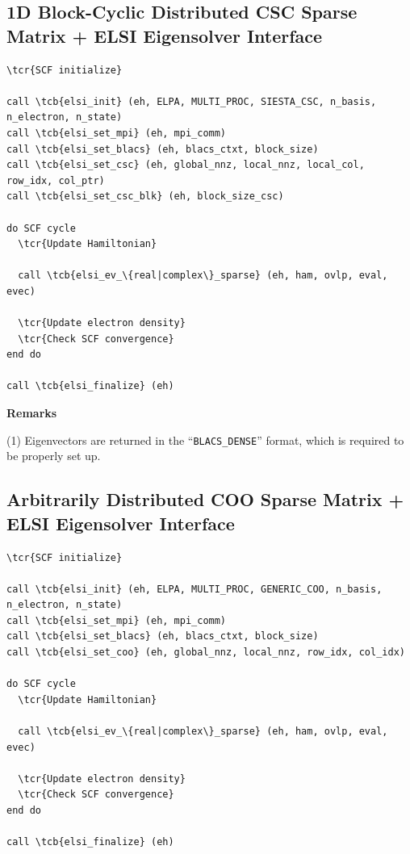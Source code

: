 \documentclass{report}
\newcommand{\tcb}[1]{\textcolor{blue}{#1}}
\newcommand{\tcr}[1]{\textcolor{red}{#1}}
\begin{document}
\subsection*{1D Block-Cyclic Distributed CSC Sparse Matrix + ELSI Eigensolver Interface}
\begin{tcolorbox}
\begin{Verbatim}[commandchars=\\\{\}]
\tcr{SCF initialize}

call \tcb{elsi_init} (eh, ELPA, MULTI_PROC, SIESTA_CSC, n_basis, n_electron, n_state)
call \tcb{elsi_set_mpi} (eh, mpi_comm)
call \tcb{elsi_set_blacs} (eh, blacs_ctxt, block_size)
call \tcb{elsi_set_csc} (eh, global_nnz, local_nnz, local_col, row_idx, col_ptr)
call \tcb{elsi_set_csc_blk} (eh, block_size_csc)

do SCF cycle
  \tcr{Update Hamiltonian}

  call \tcb{elsi_ev_\{real|complex\}_sparse} (eh, ham, ovlp, eval, evec)

  \tcr{Update electron density}
  \tcr{Check SCF convergence}
end do

call \tcb{elsi_finalize} (eh)
\end{Verbatim}
\end{tcolorbox}

\textbf{Remarks}

(1) Eigenvectors are returned in the ``\texttt{BLACS\_DENSE}'' format, which is required to be properly set up.

\subsection*{Arbitrarily Distributed COO Sparse Matrix + ELSI Eigensolver Interface}
\begin{tcolorbox}
\begin{Verbatim}[commandchars=\\\{\}]
\tcr{SCF initialize}

call \tcb{elsi_init} (eh, ELPA, MULTI_PROC, GENERIC_COO, n_basis, n_electron, n_state)
call \tcb{elsi_set_mpi} (eh, mpi_comm)
call \tcb{elsi_set_blacs} (eh, blacs_ctxt, block_size)
call \tcb{elsi_set_coo} (eh, global_nnz, local_nnz, row_idx, col_idx)

do SCF cycle
  \tcr{Update Hamiltonian}

  call \tcb{elsi_ev_\{real|complex\}_sparse} (eh, ham, ovlp, eval, evec)

  \tcr{Update electron density}
  \tcr{Check SCF convergence}
end do

call \tcb{elsi_finalize} (eh)
\end{Verbatim}
\end{tcolorbox}
\end{document}
